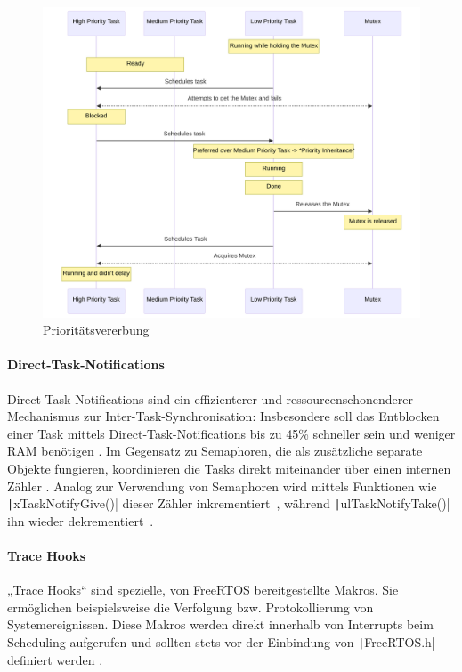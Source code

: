 \begin{figure}[H]
    \centering
    \includegraphics[width=1\textwidth]{assets/prio_inheritance}
    \caption{Prioritätsvererbung}
\end{figure}

\paragraph{Direct-Task-Notifications} \label{sec:direct_task_notification}

Direct-Task-Notifications sind ein effizienterer und ressourcenschonenderer
Mechanismus zur Inter-Task-Synchronisation: Insbesondere soll das Entblocken
einer Task mittels Direct-Task-Notifications bis zu 45\% schneller sein und
weniger RAM benötigen \cite{freertos_task_notifications_usage}. Im Gegensatz zu
Semaphoren, die als zusätzliche separate Objekte fungieren, koordinieren die
Tasks direkt miteinander über einen internen Zähler \cite{freertos_tasks_c_308}.
Analog zur Verwendung von Semaphoren wird mittels Funktionen wie
\texttt|xTaskNotifyGive()| dieser Zähler
inkrementiert~\cite{freertos_tasks_c_4990}, während
\texttt|ulTaskNotifyTake()| ihn wieder
dekrementiert~\cite{freertos_tasks_c_4614}.

\paragraph{Trace Hooks} \label{sec:trace_hooks}

„Trace Hooks“ sind spezielle, von FreeRTOS bereitgestellte Makros. Sie
ermöglichen beispielsweise die Verfolgung bzw. Protokollierung von
Systemereignissen. Diese Makros werden direkt innerhalb von Interrupts beim
Scheduling aufgerufen und sollten stets vor der Einbindung von
\texttt|FreeRTOS.h| definiert werden \cite{freertos_rtos_trace_hooks}.

